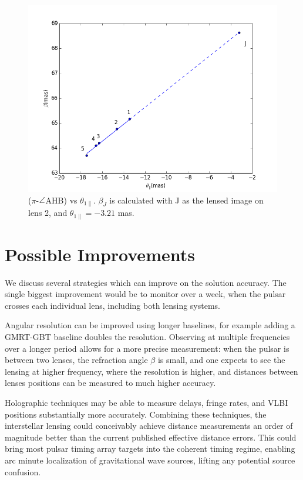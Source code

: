 \documentclass[useAMS,usenatbib]{mn2e}
\begin{document}
\begin{figure}
\centering
\includegraphics[width=1.0\linewidth]{Reflection_angle.png}
\caption{  ($\pi$-$\protect\angle$AHB) vs $\theta_{1\parallel}$.
$\beta_J$ is calculated with J as the lensed image on lens 2, and $\theta_{1\parallel}=-3.21$ mas.}
\label{vtrans}
\end{figure}



\section{Possible Improvements}

We discuss several strategies which can improve on the solution
accuracy.  The single biggest improvement would be to monitor over a
week, when the pulsar crosses each individual lens, including both
lensing systems.

Angular resolution can be improved using longer baselines, for example
adding a GMRT-GBT baseline doubles the resolution.  Observing at
multiple frequencies over a longer period allows for a more precise
measurement: when the pulsar is between two lenses, the refraction
angle $\beta$ is small, and one expects to see the lensing at higher
frequency, where the resolution is higher, and distances between
lenses positions can be measured to much higher accuracy.

Holographic techniques \citep{2008MNRAS.388.1214W,2014MNRAS.440L..36P}
may be able to measure delays, fringe rates, and VLBI positions
substantially more accurately.  Combining these techniques, the
interstellar lensing could conceivably achieve distance measurements
an order of magnitude better than the current published effective
distance errors.  This could bring most pulsar timing array targets
into the coherent timing regime, enabling arc minute localization of
gravitational wave sources, lifting any potential source confusion.
\end{document}
